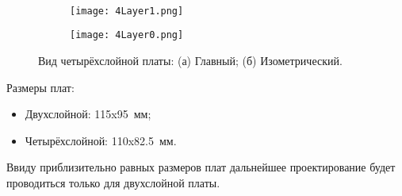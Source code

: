 \begin{figure}[H]
	\centering\
	\begin{subfigure}[b]{0.45\textwidth}
		\centering
		\texttt{[image: 4Layer1.png]}
		\caption{}%
		\label{fig:4Layer1}
	\end{subfigure}
	\hfill
	\begin{subfigure}[b]{0.45\textwidth}
		\centering
		\texttt{[image: 4Layer0.png]}
		\caption{}%
		\label{fig:4Layer0}
	\end{subfigure}
	\caption{%
		Вид четырёхслойной платы:
		(а) Главный;
		(б) Изометрический.
	}%
	\label{fig:4Layer3D}
\end{figure}

Размеры плат:
\begin{itemize}
	\item Двухслойной: 115x95~мм;
	\item Четырёхслойной: 110x82.5~мм.
\end{itemize}

Ввиду приблизительно равных размеров плат дальнейшее проектирование будет проводиться только для двухслойной платы.